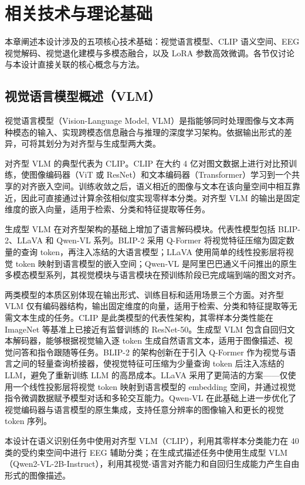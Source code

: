 \section{相关技术与理论基础}

本章阐述本设计涉及的五项核心技术基础：视觉语言模型、CLIP 语义空间、EEG 视觉解码、视觉退化建模与多模态融合，以及 LoRA 参数高效微调。各节仅讨论与本设计直接关联的核心概念与方法。

\subsection{视觉语言模型概述（VLM）}

视觉语言模型（Vision-Language Model, VLM）是指能够同时处理图像与文本两种模态的输入、实现跨模态信息融合与推理的深度学习架构。依据输出形式的差异，可将其划分为对齐型与生成型两大类。

对齐型 VLM 的典型代表为 CLIP。CLIP 在大约 4 亿对图文数据上进行对比预训练，使图像编码器（ViT 或 ResNet）和文本编码器（Transformer）学习到一个共享的对齐嵌入空间。训练收敛之后，语义相近的图像与文本在该向量空间中相互靠近，因此可直接通过计算余弦相似度实现零样本分类。对齐型 VLM 的输出是固定维度的嵌入向量，适用于检索、分类和特征提取等任务。

生成型 VLM 在对齐型架构的基础上增加了语言解码模块。代表性模型包括 BLIP-2、LLaVA 和 Qwen-VL 系列。BLIP-2 采用 Q-Former 将视觉特征压缩为固定数量的查询 token，再注入冻结的大语言模型；LLaVA 使用简单的线性投影层将视觉 token 映射到语言模型的嵌入空间；Qwen-VL 是阿里巴巴通义千问推出的原生多模态模型系列，其视觉模块与语言模块在预训练阶段已完成端到端的图文对齐。

两类模型的本质区别体现在输出形式、训练目标和适用场景三个方面。对齐型 VLM 仅有编码器结构，输出固定维度的向量，适用于检索、分类和特征提取等无需文本生成的任务。CLIP 是此类模型的代表性架构，其零样本分类性能在 ImageNet 等基准上已接近有监督训练的 ResNet-50。生成型 VLM 包含自回归文本解码器，能够根据视觉输入逐 token 生成自然语言文本，适用于图像描述、视觉问答和指令跟随等任务。BLIP-2 的架构创新在于引入 Q-Former 作为视觉与语言之间的轻量查询桥接器，使视觉特征可压缩为少量查询 token 后注入冻结的 LLM，避免了重新训练 LLM 的高昂成本。LLaVA 采用了更简洁的方案——仅使用一个线性投影层将视觉 token 映射到语言模型的 embedding 空间，并通过视觉指令微调数据赋予模型对话和多轮交互能力。Qwen-VL 在此基础上进一步优化了视觉编码器与语言模型的原生集成，支持任意分辨率的图像输入和更长的视觉 token 序列。

本设计在语义识别任务中使用对齐型 VLM（CLIP），利用其零样本分类能力在 40 类的受约束空间中进行 EEG 辅助分类；在生成式描述任务中使用生成型 VLM（Qwen2-VL-2B-Instruct），利用其视觉-语言对齐能力和自回归生成能力产生自由形式的图像描述。

